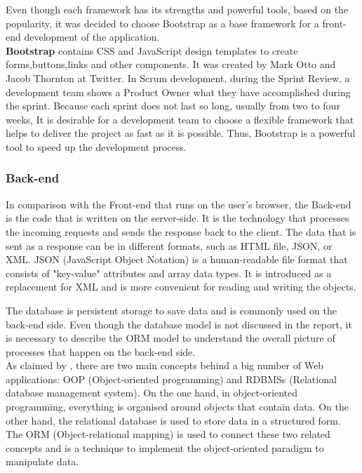 \documentclass[a4paper]{article}
\begin{document}
    Even though each framework has its strengths and powerful tools, based on the popularity, it was decided to choose Bootstrap as a base framework for a front-end development of the application. \\
    
    \textbf{Bootstrap} contains CSS and JavaScript design templates to create forms,buttons,links and other components. It was created by Mark Otto and Jacob Thornton at Twitter. In Scrum development, during the Sprint Review, a development team shows a Product Owner what they have accomplished during the sprint. Because each sprint does not last so long, usually from two to four weeks, It is desirable for a development team to choose a flexible framework that helps to deliver the project as fast as it is possible. Thus, Bootstrap is a powerful tool to speed up the development process.
    
    \subsubsection{Back-end}
    In comparison with the Front-end that runs on the user's browser, the Back-end is the code that is written on the server-side. It is the technology that processes the incoming requests and sends the response back to the client. The data that is sent as a response can be in different formats, such as HTML file, JSON, or XML. JSON (JavaScript Object Notation) is a human-readable file format that consists of "key-value" attributes and array data types. It is introduced as a replacement for XML and is more convenient for reading and writing the objects. 
    
    The database is persistent storage to save data and is commonly used on the back-end side. Even though the database model is not discussed in the report, it is necessary to describe the ORM model to understand the overall picture of processes that happen on the back-end side. \\
    
    As claimed by \cite{barnes2007object}, there are two main concepts behind a big number of Web applications: OOP (Object-oriented programming) and RDBMSs (Relational database management system). On the one hand, in object-oriented programming, everything is organised around objects that contain data. On the other hand, the relational database is used to store data in a structured form. The ORM (Object-relational mapping) is used to connect these two related concepts and is a technique to implement the object-oriented paradigm to manipulate data. 
    
\end{document}
